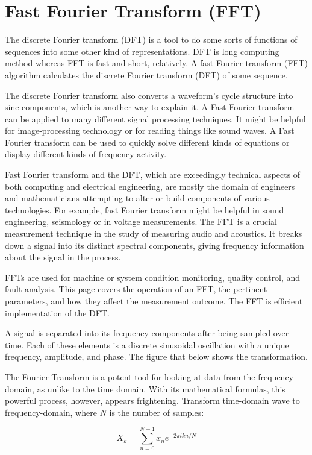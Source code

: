 \documentclass[a4paper, 12pt]{scrartcl}
\begin{document}
\section{Fast Fourier Transform (FFT)}

The discrete Fourier transform (DFT) is a tool to do some sorts of functions of sequences into some other kind of representations.
DFT is long computing method whereas FFT is fast and short, relatively.
A fast Fourier transform (FFT) algorithm calculates the discrete Fourier transform (DFT) of some sequence.

The discrete Fourier transform also converts a waveform's cycle structure into sine components, which is another way to explain it.
A Fast Fourier transform can be applied to many different signal processing techniques.
It might be helpful for image-processing technology or for reading things like sound waves.
A Fast Fourier transform can be used to quickly solve different kinds of equations or display different kinds of frequency activity.

Fast Fourier transform and the DFT, which are exceedingly technical aspects of both computing and electrical engineering, are mostly the domain of engineers and mathematicians attempting to alter or build components of various technologies.
For example, fast Fourier transform might be helpful in sound engineering, seismology or in voltage measurements.
The FFT is a crucial measurement technique in the study of measuring audio and acoustics.
It breaks down a signal into its distinct spectral components, giving frequency information about the signal in the process.

FFTs are used for machine or system condition monitoring, quality control, and fault analysis.
This page covers the operation of an FFT, the pertinent parameters, and how they affect the measurement outcome.
The FFT is efficient implementation of the DFT.

A signal is separated into its frequency components after being sampled over time.
Each of these elements is a discrete sinusoidal oscillation with a unique frequency, amplitude, and phase.
The figure that below shows the transformation.

The Fourier Transform is a potent tool for looking at data from the frequency domain, as unlike to the time domain.
With its mathematical formulas, this powerful process, however, appears frightening.
Transform time-domain wave to frequency-domain, where $N$ is the number of samples:

\begin{equation}
  X_k = \sum_{n=0}^{N-1} x_n e^{-2 \pi i k n / N}
\end{equation}
\end{document}
